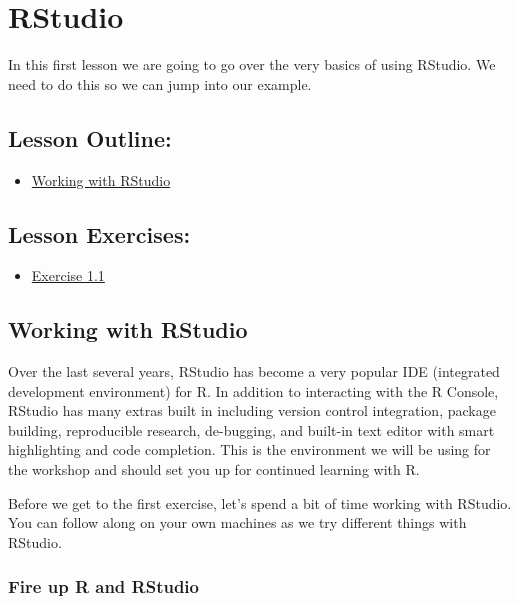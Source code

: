 \documentclass[]{article}
\title{}
\author{}
\date{}
\providecommand{\tightlist}{%
  \setlength{\itemsep}{0pt}\setlength{\parskip}{0pt}}
\begin{document}
\hypertarget{rstudio}{%
\section{RStudio}\label{rstudio}}

In this first lesson we are going to go over the very basics of using
RStudio. We need to do this so we can jump into our example.

\hypertarget{lesson-outline}{%
\subsection{Lesson Outline:}\label{lesson-outline}}

\begin{itemize}
\tightlist
\item
  \protect\hyperlink{working-with-rstudio}{Working with RStudio}
\end{itemize}

\hypertarget{lesson-exercises}{%
\subsection{Lesson Exercises:}\label{lesson-exercises}}

\begin{itemize}
\tightlist
\item
  \protect\hyperlink{exercise-11}{Exercise 1.1}
\end{itemize}

\hypertarget{working-with-rstudio}{%
\subsection{Working with RStudio}\label{working-with-rstudio}}

Over the last several years, RStudio has become a very popular IDE
(integrated development environment) for R. In addition to interacting
with the R Console, RStudio has many extras built in including version
control integration, package building, reproducible research,
de-bugging, and built-in text editor with smart highlighting and code
completion. This is the environment we will be using for the workshop
and should set you up for continued learning with R.

Before we get to the first exercise, let's spend a bit of time working
with RStudio. You can follow along on your own machines as we try
different things with RStudio.

\hypertarget{fire-up-r-and-rstudio}{%
\subsubsection{Fire up R and RStudio}\label{fire-up-r-and-rstudio}}
\end{document}
